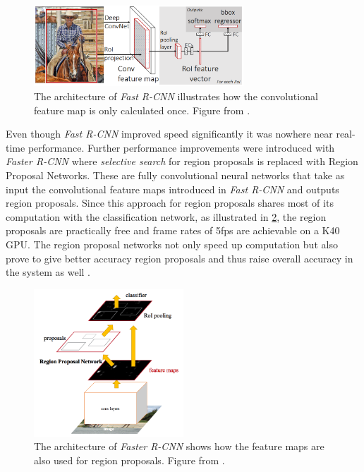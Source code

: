 \documentclass{kththesis}
\newcommand{\bibentry}[1]{\parencite{#1}}
\begin{document}
\begin{figure}[h]
  \centering
  \includegraphics[width=0.7\textwidth]{FastR-CNN}
  \caption{The architecture of \textit{Fast R-CNN} illustrates how the
    convolutional feature map is only calculated once. Figure from \textcite{girshick2015fast}.}
  \label{fig:FastR-CNN}
  \end{figure}

Even though
\emph{Fast R-CNN} improved speed significantly it was nowhere near real-time
performance. Further performance improvements were introduced with \emph{Faster
  R-CNN} \bibentry{ren2015faster} where \emph{selective search} for region
proposals is replaced with Region Proposal Networks. These are fully convolutional neural
networks that take as input the convolutional feature maps introduced in 
\emph{Fast R-CNN}\parencite{girshick2015fast} and outputs region proposals. Since this approach for region
proposals shares most of its computation with the classification network, as illustrated in \cref{fig:FasterR-CNN}, the
region proposals are practically free and frame rates of 5fps are achievable on
a K40 GPU.
The region proposal networks not only speed up computation but also prove to
give better accuracy region proposals and thus raise overall accuracy in the
system as well \bibentry{ren2015faster}.

\begin{figure}[h]
  \centering
  \includegraphics[width=0.5\textwidth]{FasterR-CNN}
  \caption{The architecture of \textit{Faster R-CNN} shows how the feature maps
    are also used for region proposals. Figure from \textcite[]{ren2015faster}.}
  \label{fig:FasterR-CNN}
  \end{figure}
\end{document}
